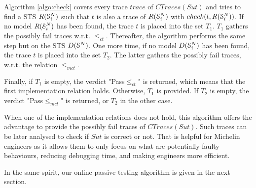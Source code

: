 Algorithm \ref{algo:check} covers every trace $trace$ of
$CTraces({Sut})$ and tries to find a STS $R(\EuScript{S}_i^{N})$
such that $t$ is also a trace of $R(\EuScript{S}_i^{N})$ with
$check(t, R(\EuScript{S}_i^{N}))$.  If no model
$R(\EuScript{S}_i^{N})$ has been found, the trace $t$ is placed
into the set $T_1$. $T_1$ gathers the possibly fail traces
w.r.t. $\leq_{ct}$. Thereafter, the algorithm performs the same
step but on the STS $D(\EuScript{S}^{N})$. One more time, if no
model $D(\EuScript{S}_i^{N})$ has been found, the trace $t$ is placed
into the set $T_2$.  The latter gathers the possibly fail traces,
w.r.t. the relation $\leq_{mct}$.

Finally, if $T_1$ is empty, the verdict "Pass$\leq_{ct}$" is
returned, which means that the first implementation relation holds.
Otherwise, $T_1$ is provided. If $T_2$ is empty, the verdict
"Pass$\leq_{mct}$" is returned, or $T_2$ in the other case.

When one of the implementation relations does not hold, this
algorithm offers the advantage to provide the possibly fail
traces of $CTraces({Sut})$. Such traces can be later analysed to
check if $\mathit{Sut}$ is correct or not. That is helpful for
Michelin engineers as it allows them to only focus on what are
potentially faulty behaviours, reducing debugging time, and
making engineers more efficient.

In the same spirit, our online passive testing algorithm is given
in the next section.
